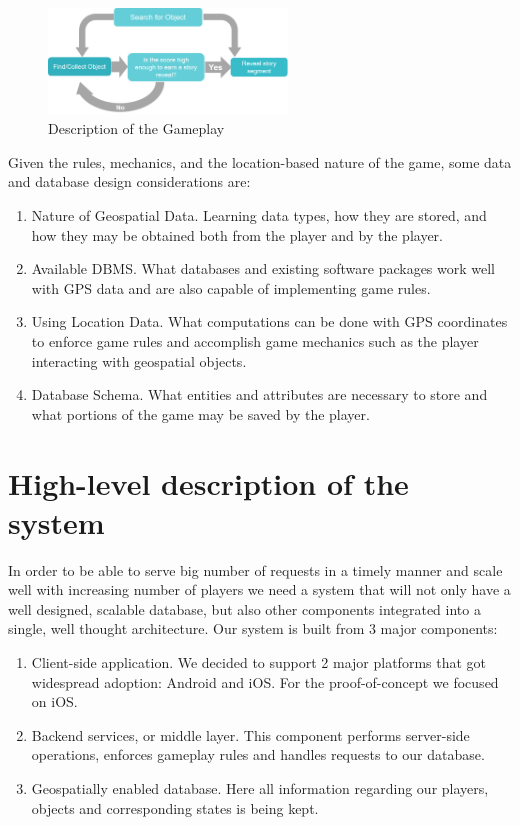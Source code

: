 \documentclass[conference]{IEEEtran}
\begin{document}
\begin{figure}
\centering
\includegraphics[width=2.5in]{imgs/Gameplay.png}
\caption{Description of the Gameplay}
\label{Gameplay}
\end{figure}

Given the rules, mechanics, and the location-based nature of the game, some data and database design considerations are:

\begin{enumerate}
	\item Nature of Geospatial Data. Learning data types, how they are stored, and how they may be obtained both from the player and by the player.
	\item Available DBMS. What databases and existing software packages work well with GPS data and are also capable of implementing game rules.
	\item Using Location Data. What computations can be done with GPS coordinates to enforce game rules and accomplish game mechanics such as the player interacting with geospatial objects.
	\item Database Schema. What entities and attributes are necessary to store and what portions of the game may be saved by the player.
\end{enumerate}
	
\section{High-level description of the system}
In order to be able to serve big number of requests in a timely manner and scale well with increasing number of players we need a system that will not only have a well designed, scalable database, but also other components integrated into a single, well thought architecture. Our system is built from 3 major components:

\begin{enumerate}
  \item Client-side application. We decided to support 2 major platforms that got widespread adoption: Android and iOS. For the proof-of-concept we focused on iOS. 
  \item Backend services, or middle layer. This component performs server-side operations, enforces gameplay rules and handles requests to our database. 
  \item Geospatially enabled database. Here all information regarding our players, objects and corresponding states is being kept. 
\end{enumerate}
\end{document}
